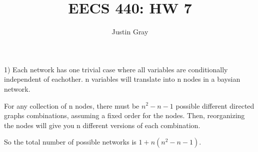 \documentclass[12pt]{article}
\title{EECS 440: HW 7}
\author{Justin Gray}
\begin{document}
\maketitle
\setcounter{equation}{0}
1) Each network has one trivial case where all variables are conditionally 
independent of eachother. n variables will translate into n nodes in a baysian 
network. 

For any collection of n nodes, there must be $n^2-n-1$ possible different
directed graphs combinations, assuming a fixed order for the nodes. Then, 
reorganizing the nodes will give you n different versions of each combination. 

So the total number of possible networks is $1+ n(n^2-n-1)$. 
\end{document}
